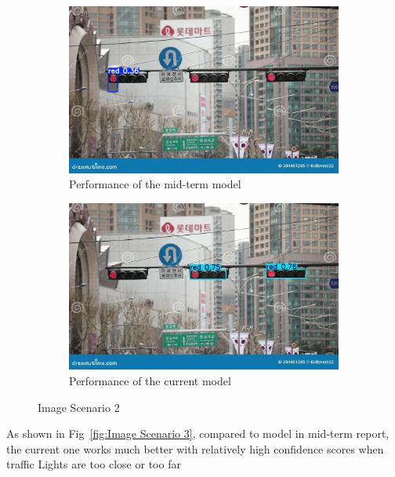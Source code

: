 \documentclass[journal,transmag]{IEEEtran}
\begin{document}
\begin{figure}[h]
    \centering
    \begin{subfigure}[b]{0.225\textwidth}
        \includegraphics[width=\textwidth]{Result_2.png}
        \caption{Performance of the mid-term model}
        \label{fig:Result_2}
    \end{subfigure}
    \hfill
    \begin{subfigure}[b]{0.225\textwidth}
        \includegraphics[width=\textwidth]{Result_2_new.jpg}
        \caption{Performance of the current model
}
        \label{fig:Result_2_new}
    \end{subfigure}
    \caption{Image Scenario 2}
    \label{fig:Image Scenario 2}
\end{figure}

As shown in Fig~\ref{fig:Image Scenario 3}, compared to model in mid-term report, the current one works much better with relatively high confidence scores when traffic Lights are too close or too far 
\end{document}
